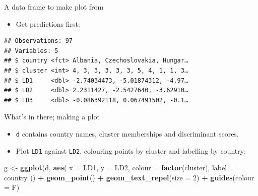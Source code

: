 \documentclass[ignorenonframetext,]{beamer}
\newenvironment{Shaded}{\begin{snugshade}}{\end{snugshade}}
\newcommand{\DataTypeTok}[1]{\textcolor[rgb]{0.13,0.29,0.53}{#1}}
\newcommand{\DecValTok}[1]{\textcolor[rgb]{0.00,0.00,0.81}{#1}}
\newcommand{\KeywordTok}[1]{\textcolor[rgb]{0.13,0.29,0.53}{\textbf{#1}}}
\newcommand{\NormalTok}[1]{#1}
\newcommand{\OperatorTok}[1]{\textcolor[rgb]{0.81,0.36,0.00}{\textbf{#1}}}
\newcommand{\StringTok}[1]{\textcolor[rgb]{0.31,0.60,0.02}{#1}}
\providecommand{\tightlist}{%
  \setlength{\itemsep}{0pt}\setlength{\parskip}{0pt}}
\begin{document}
\begin{frame}[fragile]{A data frame to make plot from}
\protect\hypertarget{a-data-frame-to-make-plot-from}{}

\begin{itemize}
\tightlist
\item
  Get predictions first:
\end{itemize}

\small

\begin{Shaded}
\end{Shaded}

\begin{verbatim}
## Observations: 97
## Variables: 5
## $ country <fct> Albania, Czechoslovakia, Hungar…
## $ cluster <int> 4, 3, 3, 3, 3, 3, 5, 4, 1, 1, 3…
## $ LD1     <dbl> -2.74034473, -5.01874312, -4.97…
## $ LD2     <dbl> 2.2311427, -2.5427640, -3.62910…
## $ LD3     <dbl> -0.086392118, 0.067491502, -0.1…
\end{verbatim}

\normalsize

\end{frame}

\begin{frame}[fragile]{What's in there; making a plot}
\protect\hypertarget{whats-in-there-making-a-plot}{}

\begin{itemize}
\tightlist
\item
  \texttt{d} contains country names, cluster memberships and
  discriminant scores.
\item
  Plot \texttt{LD1} against \texttt{LD2}, colouring points by cluster
  and labelling by country:
\end{itemize}

\begin{Shaded}
\begin{Highlighting}[]
\NormalTok{g <-}\StringTok{ }\KeywordTok{ggplot}\NormalTok{(d, }\KeywordTok{aes}\NormalTok{(}
  \DataTypeTok{x =}\NormalTok{ LD1, }\DataTypeTok{y =}\NormalTok{ LD2, }\DataTypeTok{colour =} \KeywordTok{factor}\NormalTok{(cluster),}
  \DataTypeTok{label =}\NormalTok{ country}
\NormalTok{)) }\OperatorTok{+}\StringTok{ }\KeywordTok{geom_point}\NormalTok{() }\OperatorTok{+}
\StringTok{  }\KeywordTok{geom_text_repel}\NormalTok{(}\DataTypeTok{size =} \DecValTok{2}\NormalTok{) }\OperatorTok{+}\StringTok{ }\KeywordTok{guides}\NormalTok{(}\DataTypeTok{colour =}\NormalTok{ F)}
\end{Highlighting}
\end{Shaded}

\end{frame}
\end{document}
